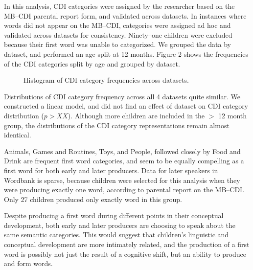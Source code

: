 \documentclass[10pt,letterpaper]{article}
\begin{document}
In this analysis, CDI categories were assigned by the researcher based on the MB--CDI parental report form, and validated across datasets. In instances where words did not appear on the MB--CDI, categories were assigned ad hoc and validated across datasets for consistency. Ninety--one children were excluded because their first word was unable to categorized. We grouped the data by dataset, and performed an age split at 12 months. Figure 2 shows the frequencies of the CDI categories split by age and grouped by dataset.

\begin{figure}[tb]
\caption{\label{fig:cdfs} Histogram of CDI category frequencies across datasets.}
\end{figure}

Distributions of CDI category frequency across all 4 datasets quite similar. We constructed a linear model, and did not find an effect of dataset on CDI category distribution ($p > XX$). Although more children are included in the $>$ 12 month group, the distributions of the CDI category representations remain almost identical.

Animals, Games and Routines, Toys, and People, followed closely by Food and Drink are frequent first word categories, and seem to be equally compelling as a first word for both early and later producers. Data for later speakers in Wordbank is sparse, because children were selected for this analysis when they were producing exactly one word, according to parental report on the MB--CDI. Only 27 children produced only exactly word in this group.

Despite producing a first word during different points in their conceptual development, both early and later producers are choosing to speak about the same semantic categories. This would suggest that children's linguistic and conceptual development are more intimately related, and the production of a first word is possibly not just the result of a cognitive shift, but an ability to produce and form words.
\end{document}
